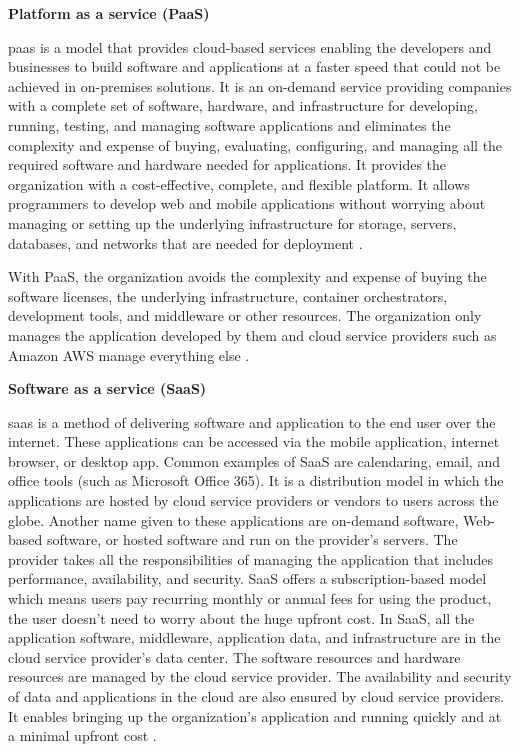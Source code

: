 \clearpage
\textbf{Platform as a service (PaaS)}
\par \gls{paas} is a model that provides cloud-based
services
enabling the developers and businesses to build software
and applications at a faster speed that could not be
achieved in on-premises solutions.
It is an on-demand service providing companies with a
complete set of software, hardware, and infrastructure for
developing, running, testing, and managing software
applications and eliminates the complexity and expense of
buying, evaluating, configuring, and managing all the
required software and hardware needed for applications.
It provides the organization with a cost-effective,
complete, and flexible platform.
It allows programmers to develop web and mobile
applications without worrying about managing or setting up the underlying infrastructure for storage, servers, databases, and networks that are needed for deployment \cite{15}.


\par With PaaS, the organization avoids the complexity and expense of buying the software licenses, the underlying infrastructure, container orchestrators, development tools, and middleware or other resources.
The organization only manages the application developed
by them and cloud service providers such as Amazon AWS
manage everything else \cite{15}.\\

\hfill \break

\textbf{Software as a service (SaaS)}
\par \gls{saas} is a method of delivering software and
application
to the end user over the internet.
These applications can be accessed via the
mobile application, internet browser, or desktop app.
Common examples of SaaS are calendaring, email, and office tools (such as Microsoft Office 365).
It is a distribution model in which the applications are hosted by cloud service providers or vendors to users across the globe.
Another name given to these applications are
on-demand
software, Web-based software, or hosted software and run
on the provider's servers.
The provider takes all the responsibilities of managing
the application that includes performance, availability, and security.
SaaS offers a subscription-based model
which
means users pay recurring monthly or annual fees for
using the product, the user doesn’t need to worry
about the huge
upfront cost.
In SaaS, all the
application software, middleware, application data, and infrastructure are in the cloud service provider’s data center.
The software resources and hardware resources are managed
by the
cloud
service provider.
The availability and security of data and applications in the cloud are also ensured by cloud service providers.
It enables bringing up the organization’s application and
running quickly and at a minimal upfront cost \cite{15}.

